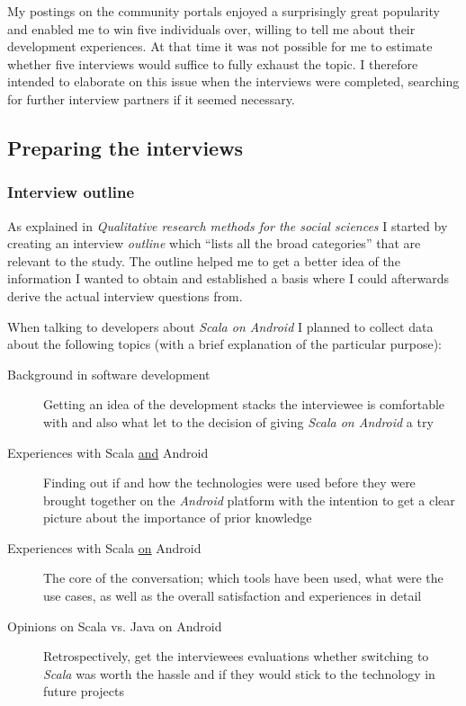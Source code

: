 My postings on the community portals enjoyed a surprisingly great popularity and enabled me to win five individuals over, willing to tell me about their development experiences. At that time it was not possible for me to estimate whether five interviews would suffice to fully exhaust the topic. I therefore intended to elaborate on this issue when the interviews were completed, searching for further interview partners if it seemed necessary.

\subsection{Preparing the interviews}

\subsubsection{Interview outline}

As explained in \textit{Qualitative research methods for the social sciences} I started by creating an interview \textit{outline} which \enquote{lists all the broad categories} \cite[p. 72]{berg01} that are relevant to the study. The outline helped me to get a better idea of the information I wanted to obtain and established a basis where I could afterwards derive the actual interview questions from.

When talking to developers about \textit{Scala on Android} I planned to collect data about the following topics (with a brief explanation of the particular purpose):

\begin{description}

	\item[Background in software development]\hfill

	Getting an idea of the development stacks the interviewee is comfortable with and also what let to the decision of giving \textit{Scala on Android} a try

	\item[Experiences with Scala \underline{and} Android]\hfill

	Finding out if and how the technologies were used before they were brought together on the \textit{Android} platform with the intention to get a clear picture about the importance of prior knowledge

	\item[Experiences with Scala \underline{on} Android]\hfill

	The core of the conversation; which tools have been used, what were the use cases, as well as the overall satisfaction and experiences in detail

	\item[Opinions on Scala vs. Java on Android]\hfill

	Retrospectively, get the interviewees evaluations whether switching to \textit{Scala} was worth the hassle and if they would stick to the technology in future projects

\end{description}

